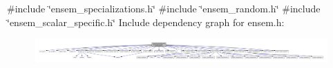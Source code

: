 {\ttfamily \#include \char`\"{}ensem\+\_\+specializations.\+h\char`\"{}}\newline
{\ttfamily \#include \char`\"{}ensem\+\_\+random.\+h\char`\"{}}\newline
{\ttfamily \#include \char`\"{}ensem\+\_\+scalar\+\_\+specific.\+h\char`\"{}}\newline
Include dependency graph for ensem.\+h\+:
\nopagebreak
\begin{figure}[H]
\begin{center}
\leavevmode
\includegraphics[width=350pt]{d9/db1/adat-devel_2lib_2ensem_2ensem_8h__incl}
\end{center}
\end{figure}
